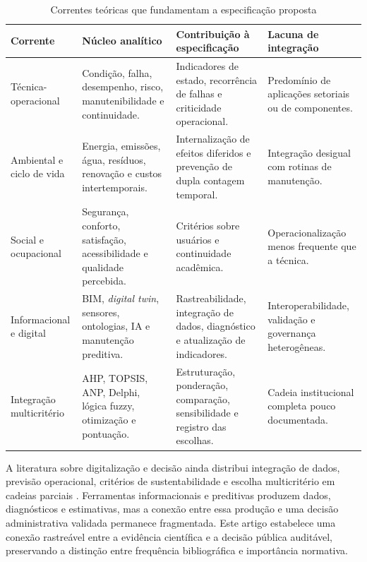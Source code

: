 \begin{table}[htbp]
\centering
\caption{Correntes teóricas que fundamentam a especificação proposta}
\label{tab:correntesteoricas}
\scriptsize
\begin{tabularx}{\textwidth}{>{\RaggedRight\arraybackslash}p{2.7cm} >{\RaggedRight\arraybackslash}p{3.3cm} >{\RaggedRight\arraybackslash}p{4.0cm} Y}
\toprule
Corrente & Núcleo analítico & Contribuição à especificação & Lacuna de integração \\
\midrule
Técnica-operacional & Condição, falha, desempenho, risco, manutenibilidade e continuidade. & Indicadores de estado, recorrência de falhas e criticidade operacional. & Predomínio de aplicações setoriais ou de componentes. \\
Ambiental e ciclo de vida & Energia, emissões, água, resíduos, renovação e custos intertemporais. & Internalização de efeitos diferidos e prevenção de dupla contagem temporal. & Integração desigual com rotinas de manutenção. \\
Social e ocupacional & Segurança, conforto, satisfação, acessibilidade e qualidade percebida. & Critérios sobre usuários e continuidade acadêmica. & Operacionalização menos frequente que a técnica. \\
Informacional e digital & BIM, \textit{digital twin}, sensores, ontologias, IA e manutenção preditiva. & Rastreabilidade, integração de dados, diagnóstico e atualização de indicadores. & Interoperabilidade, validação e governança heterogêneas. \\
Integração multicritério & AHP, TOPSIS, ANP, Delphi, lógica fuzzy, otimização e pontuação. & Estruturação, ponderação, comparação, sensibilidade e registro das escolhas. & Cadeia institucional completa pouco documentada. \\
\bottomrule
\end{tabularx}
\fonteautor
\end{table}

A literatura sobre digitalização e decisão ainda distribui integração de dados, previsão operacional, critérios de sustentabilidade e escolha multicritério em cadeias parciais \parencite{deng_bimdigitaltwins_2021,das_iotai_2025,alfalah_frameworkeducacional_2022,masmoudi_ahptopsis_2026}. Ferramentas informacionais e preditivas produzem dados, diagnósticos e estimativas, mas a conexão entre essa produção e uma decisão administrativa validada permanece fragmentada. Este artigo estabelece uma conexão rastreável entre a evidência científica e a decisão pública auditável, preservando a distinção entre frequência bibliográfica e importância normativa.

